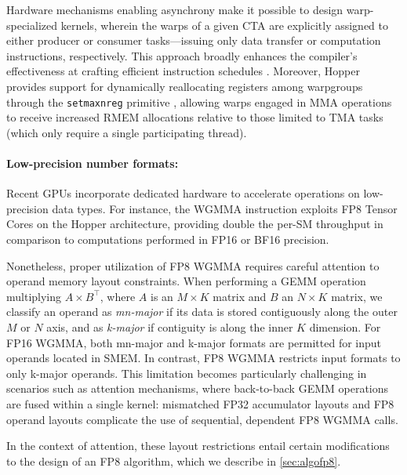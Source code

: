 Hardware mechanisms enabling asynchrony make it possible to design warp-specialized kernels, wherein the warps of a given CTA are explicitly assigned to either producer or consumer tasks—issuing only data transfer or computation instructions, respectively. This approach broadly enhances the compiler's effectiveness at crafting efficient instruction schedules \citep{warp-specialization-2011}. Moreover, Hopper provides support for dynamically reallocating registers among warpgroups through the \verb|setmaxnreg| primitive \cite[\S9.7.17.1]{ptx}, allowing warps engaged in MMA operations to receive increased RMEM allocations relative to those limited to TMA tasks (which only require a single participating thread).

\paragraph{Low-precision number formats:}
\label{sec:low-precision-gpu}
Recent GPUs incorporate dedicated hardware to accelerate operations on low-precision data types. For instance, the WGMMA instruction exploits FP8 Tensor Cores on the Hopper architecture, providing double the per-SM throughput in comparison to computations performed in FP16 or BF16 precision.

Nonetheless, proper utilization of FP8 WGMMA requires careful attention to operand memory layout constraints. When performing a GEMM operation multiplying $A \times B^{\top}$, where $A$ is an $M\times K$ matrix and $B$ an $N\times K$ matrix, we classify an operand as \emph{mn-major} if its data is stored contiguously along the outer $M$ or $N$ axis, and as \emph{k-major} if contiguity is along the inner $K$ dimension. For FP16 WGMMA, both mn-major and k-major formats are permitted for input operands located in SMEM. In contrast, FP8 WGMMA restricts input formats to only k-major operands. This limitation becomes particularly challenging in scenarios such as attention mechanisms, where back-to-back GEMM operations are fused within a single kernel: mismatched FP32 accumulator layouts and FP8 operand layouts complicate the use of sequential, dependent FP8 WGMMA calls.

In the context of attention, these layout restrictions entail certain modifications to the design of an FP8 algorithm, which we describe in \cref{sec:algofp8}.

